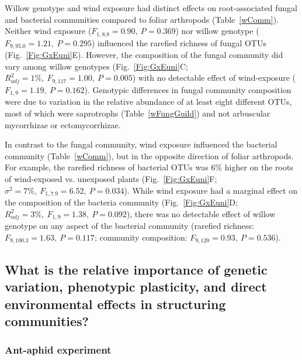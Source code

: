 \documentclass[11pt]{article}
\begin{document}
Willow genotype and wind exposure had distinct effects on
root-associated fungal and bacterial communities compared to foliar
arthropods (Table~\ref{wComm}). Neither wind exposure (\(F_{1,8.8}=0.90,\ P=0.369\)) nor
willow genotype (\(F_{9,95.0}=1.21,\ P=0.295\)) influenced the rarefied richness of
fungal OTUs (Fig.~\ref{Fig:GxEuni}E). However, the composition of the fungal community
did vary among willow genotypes (Fig.~\ref{Fig:GxEuni}C; \(R_{adj}^2=1\%,\ F_{9,117}=1.00,\ P=0.005\)) with no
detectable effect of wind-exposure (\(F_{1,9}=1.19,\ P=0.162\)). Genotypic
differences in fungal community composition were due to variation in the
relative abundance of at least eight different OTUs, most of which were
saprotrophs (Table~\ref{wFungGuild}) and not arbuscular mycorrhizae or ectomycorrhizae.

In contrast to the fungal community, wind exposure influenced the
bacterial community (Table~\ref{wComm}), but in the opposite direction of foliar
arthropods. For example, the rarefied richness of bacterial OTUs was 6\%
higher on the roots of wind-exposed vs. unexposed plants (Fig.~\ref{Fig:GxEuni}F;
\(\sigma^2=7\%,\ F_{1,7.9}=6.52,\ P=0.034\)). While wind exposure had a marginal effect on the
composition of the bacteria community (Fig.~\ref{Fig:GxEuni}D; \(R_{adj}^2=3\%,\ F_{1,9}=1.38,\ P=0.092\)),
there was no detectable effect of willow genotype on any aspect of the
bacterial community (rarefied richness: \(F_{9,100.3}=1.63,\ P=0.117\); community
composition: \(F_{9,120}=0.93,\ P=0.536\)).

\subsection*{What is the relative importance of genetic
variation, phenotypic plasticity, and direct environmental effects in
structuring
communities?}

\subsubsection*{Ant-aphid experiment}
\end{document}
